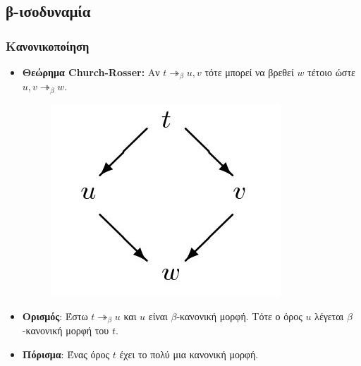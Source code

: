 \documentclass{beamer}
\begin{document}
\subsection{β-ισοδυναμία}


\begin{frame}
  \frametitle{Κανονικοποίηση}
  \begin{itemize}
  \item \textbf{Θεώρημα Church-Rosser:} Αν $t \twoheadrightarrow
    _\beta u, v$ τότε μπορεί να βρεθεί $w$ τέτοιο ώστε $ u, v
    \twoheadrightarrow _\beta w$.
    \begin{figure}
      \includegraphics[scale=0.3]{CR.jpg} 
    \end{figure} \pause
  \item \textbf{Ορισμός}: Έστω $t \twoheadrightarrow _\beta u$ και $u$
    είναι $\beta$-κανονική μορφή. Τότε ο όρος $u$ λέγεται
    $\beta$-κανονική μορφή του $t$.
  \item \textbf{Πόρισμα}: Ένας όρος $t$ έχει το πολύ μια κανονική
    μορφή.
  \end{itemize}
\end{frame}
\end{document}
